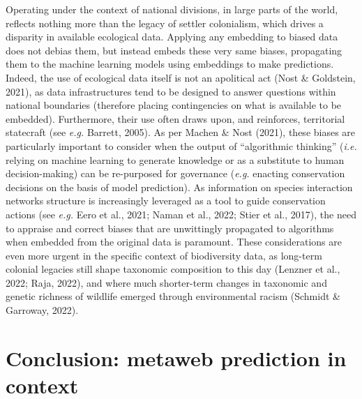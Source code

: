 \documentclass[11pt]{article}
\begin{document}
Operating under the context of national divisions, in large parts of the
world, reflects nothing more than the legacy of settler colonialism,
which drives a disparity in available ecological data. Applying any
embedding to biased data does not debias them, but instead embeds these
very same biases, propagating them to the machine learning models using
embeddings to make predictions. Indeed, the use of ecological data
itself is not an apolitical act (Nost \& Goldstein, 2021), as data
infrastructures tend to be designed to answer questions within national
boundaries (therefore placing contingencies on what is available to be
embedded). Furthermore, their use often draws upon, and reinforces,
territorial statecraft (see \emph{e.g.} Barrett, 2005). As per Machen \&
Nost (2021), these biases are particularly important to consider when
the output of ``algorithmic thinking'' (\emph{i.e.} relying on machine
learning to generate knowledge or as a substitute to human
decision-making) can be re-purposed for governance (\emph{e.g.} enacting
conservation decisions on the basis of model prediction). As information
on species interaction networks structure is increasingly leveraged as a
tool to guide conservation actions (see \emph{e.g.} Eero et al., 2021;
Naman et al., 2022; Stier et al., 2017), the need to appraise and
correct biases that are unwittingly propagated to algorithms when
embedded from the original data is paramount. These considerations are
even more urgent in the specific context of biodiversity data, as
long-term colonial legacies still shape taxonomic composition to this
day (Lenzner et al., 2022; Raja, 2022), and where much shorter-term
changes in taxonomic and genetic richness of wildlife emerged through
environmental racism (Schmidt \& Garroway, 2022).

\hypertarget{conclusion-metaweb-prediction-in-context}{%
\section{Conclusion: metaweb prediction in
context}\label{conclusion-metaweb-prediction-in-context}}
\end{document}
